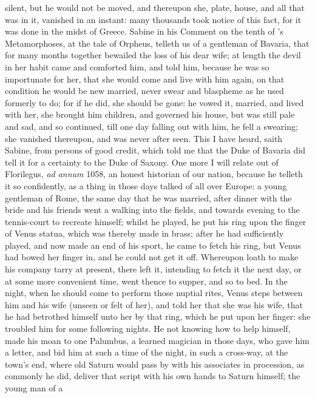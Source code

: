 silent, but he would not be moved, and thereupon she, plate, house, and
all that was in it, vanished in an instant: many thousands took
notice of this fact, for it was done in the midst of Greece. Sabine in
his Comment on the tenth of \Ovid's Metamorphoses, at the tale of
Orpheus, telleth us of a gentleman of Bavaria, that for many months
together bewailed the loss of his dear wife; at length the devil in her
habit came and comforted him, and told him, because he was so
importunate for her, that she would come and live with him again, on
that condition he would be new married, never swear and blaspheme as he
used formerly to do; for if he did, she should be gone: he vowed
it, married, and lived with her, she brought him children, and governed
his house, but was still pale and sad, and so continued, till one day
falling out with him, he fell a swearing; she vanished thereupon, and
was never after seen. This I have heard, saith Sabine, from
persons of good credit, which told me that the Duke of Bavaria did tell
it for a certainty to the Duke of Saxony. One more I will relate out of
Florilegus, \emph{ad annum} 1058, an honest historian of our nation, because
he telleth it so confidently, as a thing in those days talked of all
over Europe: a young gentleman of Rome, the same day that he was
married, after dinner with the bride and his friends went a walking
into the fields, and towards evening to the tennis-court to recreate
himself; whilst he played, he put his ring upon the finger of Venus
statua, which was thereby made in brass; after he had sufficiently
played, and now made an end of his sport, he came to fetch his ring,
but Venus had bowed her finger in, and he could not get it off.
Whereupon loath to make his company tarry at present, there left it,
intending to fetch it the next day, or at some more convenient time,
went thence to supper, and so to bed. In the night, when he should come
to perform those nuptial rites, Venus steps between him and his wife
(unseen or felt of her), and told her that she was his wife, that he
had betrothed himself unto her by that ring, which he put upon her
finger: she troubled him for some following nights. He not knowing how
to help himself, made his moan to one Palumbus, a learned magician in
those days, who gave him a letter, and bid him at such a time of the
night, in such a cross-way, at the town's end, where old Saturn would
pass by with his associates in procession, as commonly he did, deliver
that script with his own hands to Saturn himself; the young man of a
